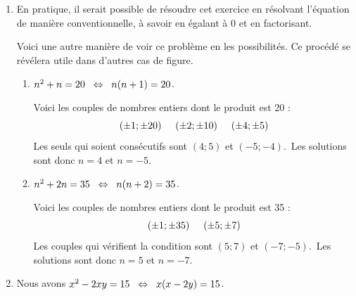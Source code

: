 \begin{enumerate}[label=\thechapter.\arabic*, font=\bfseries, itemsep=7mm,labelsep*=3mm,left=0mm]
\begin{enumerate}[label=\alph*)]
\smallskip
Nous avons que soit $k$ soit $k+1$ est pair et par conséquent $k(k+1)=2m$.

\smallskip
Donc $n^2=4\cdot 2m +1 = 8m+1$ et le reste de la division de $n^2$ par 8 est de 1.
\item Soit $n=2k$ un nombre entier pair. Alors $n^2=4k^2$ et deux cas sont possibles :

\smallskip
\textbf{$\bm{k}$ est pair :} $k=2m$ donc $n^2=4\cdot(2m)^2=16m^2=8\cdot(2m^2)+\fbox{$0$}$\\
 On conclut que $n^2$ est un multiple de 8.

\vspace{-2mm}
\textbf{$\bm{k}$ est impair :} $k=2m+1$ donc $n^2=4(4m^2+4m+1)=16m^2+16m+4=8\overbrace{(2m^2+2m)}^{quotient}+\fbox{$4$}$\\
 Donc le reste de la division de $n^2$ par 8 est 4 car $0\leqslant 4 < 8$.
\end{enumerate}
\pagebreak



\item
En pratique, il serait possible de résoudre cet exercice en résolvant l'équation de manière conventionnelle, à savoir en égalant à 0 et en factorisant.

\smallskip
Voici une autre manière de voir ce problème en  les possibilités. Ce procédé se révélera utile dans d'autres cas de figure.

\begin{enumerate}[label=\alph*)]\setlength{\itemsep}{4mm}
\item $n^2+n=20 \ssi[2] n(n+1)=20$. 

\smallskip
Voici les couples de nombres entiers dont le produit est 20 : 
$$(\pm 1;\pm 20) \eh{5} (\pm 2;\pm 10) \eh{5} (\pm 4;\pm 5)$$
Les seuls qui soient consécutifs sont $(4; 5)$ et $(-5; -4)$. \,Les solutions sont donc $n=4$ et $n=-5$.

\item $n^2+2n=35 \ssi[2] n(n+2)=35$. 

\smallskip
Voici les couples de nombres entiers dont le produit est 35 : 
$$(\pm 1;\pm 35) \eh{5} (\pm 5;\pm 7)$$
Les couples qui vérifient la condition sont $(5; 7)$ et $(-7; -5)$. \,Les solutions sont donc $n=5$ et $n=-7$.
\end{enumerate}



\item
Nous avons $x^2-2xy=15 \ssi[2] x(x-2y)=15$.


\end{enumerate}
